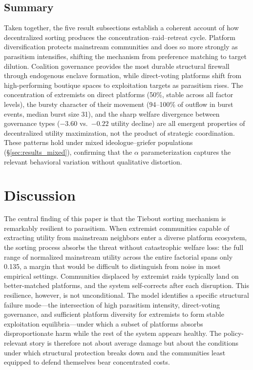 \documentclass{article}
\begin{document}
\subsection{Summary}
\label{sec:results_summary}

Taken together, the five result subsections establish a coherent account of how decentralized sorting produces the concentration--raid--retreat cycle. Platform diversification protects mainstream communities and does so more strongly as parasitism intensifies, shifting the mechanism from preference matching to target dilution. Coalition governance provides the most durable structural firewall through endogenous enclave formation, while direct-voting platforms shift from high-performing boutique spaces to exploitation targets as parasitism rises. The concentration of extremists on direct platforms (50\%, stable across all factor levels), the bursty character of their movement (94--100\% of outflow in burst events, median burst size 31), and the sharp welfare divergence between governance types ($-3.60$ vs.\ $-0.22$ utility decline) are all emergent properties of decentralized utility maximization, not the product of strategic coordination. These patterns hold under mixed ideologue--griefer populations (§\ref{sec:results_mixed}), confirming that the $\alpha$ parameterization captures the relevant behavioral variation without qualitative distortion.

\section{Discussion}
\label{sec:discussion}

The central finding of this paper is that the Tiebout sorting mechanism is remarkably resilient to parasitism. When extremist communities capable of extracting utility from mainstream neighbors enter a diverse platform ecosystem, the sorting process absorbs the threat without catastrophic welfare loss: the full range of normalized mainstream utility across the entire factorial spans only 0.135, a margin that would be difficult to distinguish from noise in most empirical settings. Communities displaced by extremist raids typically land on better-matched platforms, and the system self-corrects after each disruption. This resilience, however, is not unconditional. The model identifies a specific structural failure mode---the intersection of high parasitism intensity, direct-voting governance, and sufficient platform diversity for extremists to form stable exploitation equilibria---under which a subset of platforms absorbs disproportionate harm while the rest of the system appears healthy. The policy-relevant story is therefore not about average damage but about the conditions under which structural protection breaks down and the communities least equipped to defend themselves bear concentrated costs.
\end{document}
